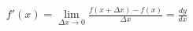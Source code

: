 \documentclass[preview]{standalone}
\begin{document}
\begin{align*}
f'(x) = \lim_{\Delta x \to 0} \frac{f(x + \Delta x) - f(x)}{\Delta x} = \frac{dy}{dx}
\end{align*}
\end{document}
